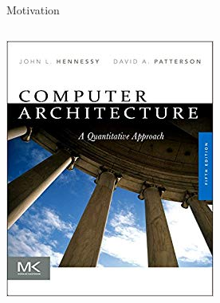 \documentclass[aspectratio=169]{beamer}
\begin{document}
\begin{frame}{Motivation}
\begin{columns}
\begin{columns}
\hspace{-0.5 cm}\includegraphics[width=\linewidth]{hennessy-book.jpg}
\end{columns}
\end{columns}
\end{frame}
\end{document}
